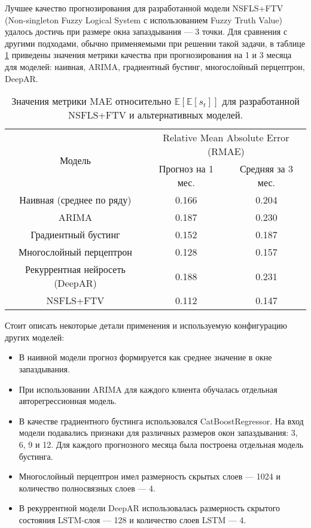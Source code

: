 Лучшее качество прогнозирования для разработанной модели NSFLS+FTV (Non-singleton Fuzzy Logical System с использованием Fuzzy Truth Value) удалось достичь при размере окна запаздывания --- 3 точки. Для сравнения с другими подходами, обычно применяемыми при решении такой задачи, в таблице \ref{tab:acquiring-metric-comparison} приведены значения метрики качества при прогнозирования на 1 и 3 месяца для моделей: наивная, ARIMA, градиентный бустинг, многослойный перцептрон, DeepAR. 

\begin{table}[t]
	\centering
	\begin{threeparttable}%
		\caption{Значения метрики MAE относительно $\mathbb{E}[\mathbb{E}[s_t]]$ для разработанной NSFLS+FTV и альтернативных моделей.}%
		\label{tab:acquiring-metric-comparison}%
		\begin{tabular}{| c | c | c |}
			\toprule
			\multirow{2}{*}{Модель} & \multicolumn{2}{|c|}{Relative Mean Absolute Error (RMAE)} \\
			\cmidrule{2-3} & Прогноз на 1 мес. & Средняя за 3 мес. \\
			\midrule
			Наивная (среднее по ряду) & 0.166 & 0.204 \\
			ARIMA & 0.187 & 0.230  \\
			Градиентный бустинг & 0.152  & 0.187 \\
			Многослойный перцептрон & 0.128 & 0.157  \\
			Рекуррентная нейросеть (DeepAR) & 0.188	 & 0.231 \\
			\midrule
			NSFLS+FTV & 0.112  & 0.147  \\ %
			\bottomrule
		\end{tabular}%
	\end{threeparttable}
\end{table}

Стоит описать некоторые детали применения и используемую конфигурацию других моделей:
\begin{itemize}
	\item В наивной модели прогноз формируется как среднее значение в окне запаздывания.
	\item При использовании ARIMA для каждого клиента обучалась отдельная авторегрессионная модель.
	\item В качестве градиентного бустинга использовался CatBoostRegressor. На вход модели подавались признаки для различных размеров окон запаздывания: 3, 6, 9 и 12. Для каждого прогнозного месяца была построена отдельная модель бустинга.
	\item Многослойный перцептрон имел размерность скрытых слоев --- 1024 и количество полносвязных слоев --- 4.
	\item В рекуррентной модели DeepAR использовалась размерность скрытого состояния LSTM-слоя --- 128 и количество слоев LSTM --- 4.
\end{itemize}

